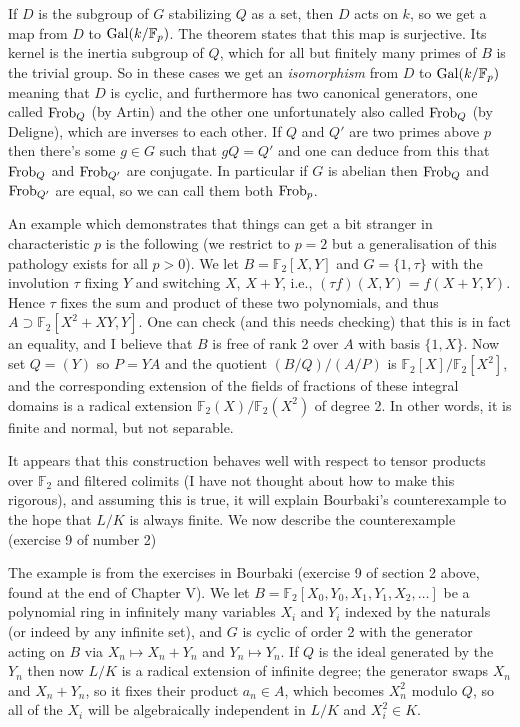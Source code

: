 If $D$ is the subgroup of $G$ stabilizing $Q$ as a set, then $D$ acts on $k$, so we get
a map from $D$ to $\operatorname{Gal}(k/\mathbb{F}_p)$. The theorem states that this map is surjective.
Its kernel is the inertia subgroup of $Q$, which for all but finitely many primes of $B$
is the trivial group. So in these cases we get an \emph{isomorphism} from $D$ to $\operatorname{Gal}(k/\mathbb{F}_p)$
meaning that $D$ is cyclic, and furthermore has two canonical generators, one called $\operatorname{Frob}_Q$
(by Artin) and the other one unfortunately also called $\operatorname{Frob}_Q$ (by Deligne), which are inverses
to each other. If $Q$ and $Q'$ are two primes above $p$ then there's some $g\in G$ such that
$gQ=Q'$ and one can deduce from this that $\operatorname{Frob}_Q$ and $\operatorname{Frob}_{Q'}$ are conjugate. In particular
if $G$ is abelian then $\operatorname{Frob}_Q$ and $\operatorname{Frob}_{Q'}$ are equal, so we can call them both $\operatorname{Frob}_p$.

An example which demonstrates that things can get a bit stranger in characteristic $p$ is the
following (we restrict to $p=2$ but a generalisation of this pathology exists for all $p>0$).
We let $B=\mathbb{F}_2[X,Y]$ and $G=\{1,\tau\}$ with the involution $\tau$
fixing $Y$ and switching $X$, $X+Y$, i.e., $(\tau f)(X,Y)=f(X+Y, Y)$.
Hence $\tau$ fixes the sum and product of these two polynomials, and thus
$A\supset \mathbb{F}_2[X^2+XY,Y]$. One can check (and this needs checking) that this
is in fact an equality, and I believe that $B$ is free of
rank 2 over $A$ with basis $\{1,X\}$.
Now set $Q=(Y)$ so $P=YA$ and the quotient $(B/Q)/(A/P)$ is
$\mathbb{F}_2[X]/\mathbb{F}_2[X^2]$, and the corresponding extension
of the fields of fractions of these integral domains is a radical extension
$\mathbb{F}_2(X)/\mathbb{F}_2(X^2)$ of degree 2.
In other words, it is finite and normal, but not separable.

It appears that this construction behaves well with respect to tensor
products over $\mathbb{F}_2$ and filtered colimits (I have not thought about
how to make this rigorous), and assuming this is true, it will explain Bourbaki's
counterexample to the hope that $L/K$ is always finite. We now describe the counterexample
(exercise 9 of number 2)

The example is from the exercises in Bourbaki (exercise 9 of section 2 above, found at the end
of Chapter V). We let $B=\mathbb{F}_2[X_0,Y_0,X_1,Y_1,X_2,\ldots]$
be a polynomial ring in infinitely many variables $X_i$ and $Y_i$ indexed by the
naturals (or indeed by any infinite set), and $G$ is cyclic of order 2 with
the generator acting on $B$ via $X_n\mapsto X_n+Y_n$ and $Y_n\mapsto Y_n$.
If $Q$ is the ideal generated by the $Y_n$ then now $L/K$ is a radical extension of
infinite degree; the generator swaps $X_n$ and $X_n+Y_n$, so it fixes
their product $a_n\in A$, which becomes $X_n^2$ modulo $Q$, so all
of the $X_{i}$ will be algebraically independent in $L/K$ and $X_{i}^2\in K$.

